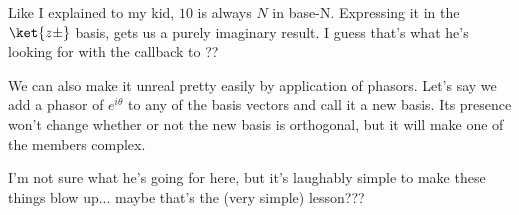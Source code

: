 \begin{answer}
  Like I explained to my kid, $10$ is always $N$ in base-N.
  Expressing it in the $\ket{z\pm}$ basis, gets us a purely imaginary
  result.  I guess that's what he's looking for with the callback to
  ??

  We can also make it unreal pretty easily by application of phasors.
  Let's say we add a phasor of $e^{i\theta}$ to any of the basis
  vectors and call it a new basis.  Its presence won't change whether
  or not the new basis is orthogonal, but it will make one of the
  members complex.

  I'm not sure what he's going for here, but it's laughably simple to
  make these things blow up... maybe that's the (very simple)
  lesson???
\end{answer}
